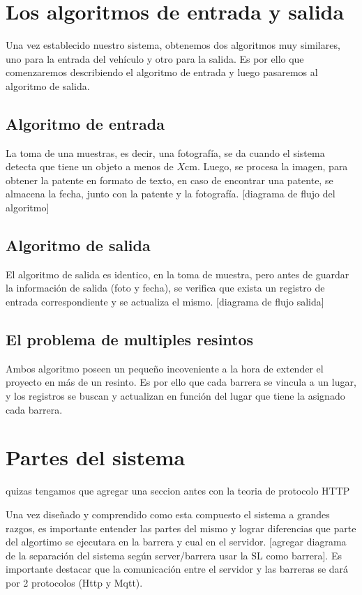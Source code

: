 \section{Los algoritmos de entrada y salida}

Una vez establecido nuestro sistema, obtenemos dos algoritmos muy similares, uno para la entrada del vehículo y otro para la salida. Es por ello que comenzaremos describiendo el algoritmo de entrada y luego pasaremos al algoritmo de salida.

\subsection{Algoritmo de entrada}

La toma de una muestras, es decir, una fotografía, se da cuando el sistema detecta que tiene un objeto a menos de $X$cm. Luego, se procesa la imagen, para obtener la patente en formato de texto, en caso de encontrar una patente, se almacena la fecha, junto con la patente y la fotografía. [diagrama de flujo del algoritmo]

\subsection{Algoritmo de salida}

El algoritmo de salida es identico, en la toma de muestra, pero antes de guardar la información de salida (foto y fecha), se verifica que exista un registro de entrada correspondiente y se actualiza el mismo. [diagrama de flujo salida]

\subsection{El problema de multiples resintos}

Ambos algoritmo poseen un pequeño incoveniente a la hora de extender el proyecto en más de un resinto. Es por ello que cada barrera se vincula a un lugar, y los registros se buscan y actualizan en función del lugar que tiene la asignado cada barrera.
\section{Partes del sistema}

 {\huge quizas tengamos que agregar una seccion antes con la teoria de protocolo HTTP}

Una vez diseñado y comprendido como esta compuesto el sistema a grandes razgos, es importante entender las partes del mismo y lograr diferencias que parte del algortimo se ejecutara en la barrera y cual en el servidor. [agregar diagrama de la separación del sistema según server/barrera usar la SL como barrera]. Es importante destacar que la comunicación entre el servidor y las barreras se dará por 2 protocolos (Http y Mqtt).

